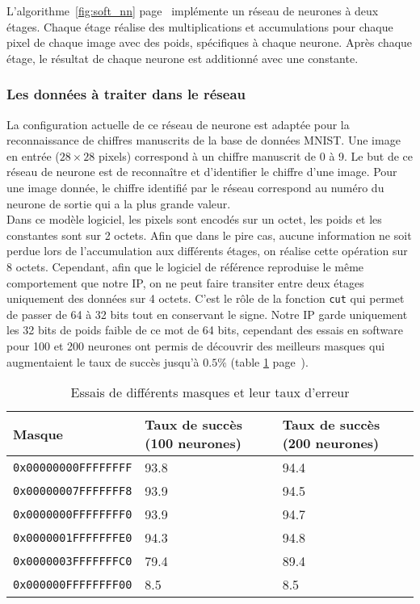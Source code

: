 L'algorithme~\ref{fig:soft_nn} page~\pageref{fig:soft_nn} implémente un réseau de neurones à deux étages.
Chaque étage réalise des multiplications et accumulations pour chaque pixel de
chaque image avec des poids, spécifiques à chaque neurone. Après chaque étage,
le résultat de chaque neurone est additionné avec une constante.

\subsubsection{Les données à traiter dans le réseau}

La configuration actuelle de ce réseau de neurone est adaptée pour la
reconnaissance de chiffres manuscrits de la base de données MNIST. Une image
en entrée ($28 \times 28$ pixels) correspond à un chiffre manuscrit de 0 à 9.
Le but de ce réseau de neurone est de reconnaître et d'identifier le chiffre
d'une image. Pour une image donnée, le chiffre identifié par le réseau correspond
au numéro du neurone de sortie qui a la plus grande valeur. \\
Dans ce modèle logiciel, les pixels sont encodés sur un octet, les poids et les
constantes sont sur 2 octets. Afin que dans le pire cas, aucune information ne
soit perdue lors de l'accumulation aux différents étages, on réalise cette opération sur
8 octets. Cependant, afin que le logiciel de référence reproduise le même
comportement que notre IP, on ne peut faire transiter entre deux étages uniquement
des données sur 4 octets. C'est
le rôle de la fonction \texttt{cut} qui permet de passer de 64 à 32 bits tout
en conservant le signe.
Notre IP garde uniquement les 32 bits de poids faible de ce mot de 64 bits,
cependant des essais en software pour 100 et 200 neurones ont permis de découvrir
des meilleurs masques qui augmentaient le taux de succès jusqu'à $0.5\%$
(table
\ref{fig:masques} page~\pageref{fig:masques}).

\begin{table}[h!]
\centering
	\begin{tabular}{| l | l | l |}
	\hline
	Masque & Taux de succès (100 neurones) & Taux de succès (200 neurones)\\ \hline
	\texttt{0x00000000FFFFFFFF} & 93.8 & 94.4 \\ \hline
	\texttt{0x00000007FFFFFFF8} & 93.9 & 94.5 \\ \hline
	\texttt{0x0000000FFFFFFFF0} & 93.9 & 94.7 \\ \hline
	\texttt{0x0000001FFFFFFFE0} & 94.3 & 94.8 \\ \hline
	\texttt{0x0000003FFFFFFFC0} & 79.4 & 89.4 \\ \hline
	\texttt{0x000000FFFFFFFF00} & 8.5  & 8.5  \\ \hline
	\end{tabular}
	\caption{Essais de différents masques et leur taux d'erreur}
	\label{fig:masques}
\end{table}


